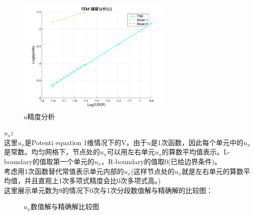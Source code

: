 \documentclass[a4paper,11pt,UTF8]{article}%
\theoremstyle{plain}
\begin{document}
			\begin{figure}[H]
	\centering
	\includegraphics[width=3in]{U精度分析.png} 
	\caption{$u$精度分析}
\end{figure}\leavevmode
\clearpage
\noindent\textbf{$u_x$:}\\
\indent 这里$u_x$是Potenti equation 1维情况下的V。由于$u$是1次函数，因此每个单元中的$u_x$是常数。均匀网格下，节点处的$u_x$可以用左右单元$u_x$的算数平均值表示。L-boundary的值取第一个单元的$u_x$，R-boundary的值取0(已给边界条件)。\\
\indent 考虑用1次函数替代常值表示单元内部的$u_x$(这样节点处的$u_x$就是左右单元的算数平均值，并且直观上1次多项式精度会比0次多项式高。) \\
\indent 这里展示单元数为8的情况下0次与1次分段数值解与精确解的比较图：
\begin{figure}[H]
	\centering
	\hfill
	\caption{$u_x$数值解与精确解比较图}
\end{figure}\leavevmode\\
\end{document}
